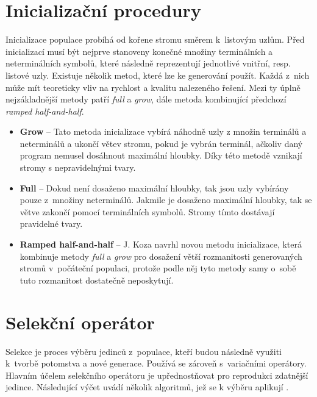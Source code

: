 \section{Inicializační procedury}
Inicializace populace probíhá od kořene stromu směrem k~listovým uzlům. Před inicializací musí být nejprve stanoveny konečné množiny terminálních a neterminálních symbolů, které následně reprezentují jednotlivé vnitřní, resp. listové uzly. Existuje několik metod, které lze ke generování použít. Každá z~nich může mít teoreticky vliv na rychlost a kvalitu nalezeného řešení. Mezi ty úplně nejzákladnější metody patří \emph{full} a \emph{grow}, dále metoda kombinující předchozí \emph{ramped half-and-half}.
\begin{itemize}
    \item \textbf{Grow} -- Tato metoda inicializace vybírá náhodně uzly z množin terminálů a neterminálů a ukončí větev stromu, pokud je vybrán terminál, ačkoliv daný program nemusel dosáhnout maximální hloubky. Díky této metodě vznikají stromy s nepravidelnými tvary.
    \item \textbf{Full} -- Dokud není dosaženo maximální hloubky, tak jsou uzly vybírány pouze z~množiny neterminálů. Jakmile je dosaženo maximální hloubky, tak se větve zakončí pomocí terminálních symbolů. Stromy tímto dostávají pravidelné tvary.
    \item \textbf{Ramped half-and-half} -- J. Koza navrhl novou metodu inicializace, která kombinuje metody \emph{full} a \emph{grow} pro dosažení větší rozmanitosti generovaných stromů v~počáteční populaci, protože podle něj tyto metody samy o~sobě tuto rozmanitost dostatečně neposkytují.
\end{itemize}

\section{Selekční operátor}\label{selection_op}
Selekce je proces výběru jedinců z~populace, kteří budou následně využiti k~tvorbě potomstva a nové generace. Používá se zároveň s~variačními operátory. Hlavním účelem selekčního operátoru je upřednostňovat pro reprodukci zdatnější jedince. Následující výčet uvádí několik algoritmů, jež se k výběru aplikují \cite{eiben-2015B}.

